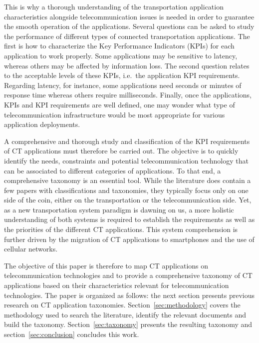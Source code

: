 This is why a thorough understanding of the transportation application characteristics alongside telecommunication issues is needed in order to guarantee the smooth operation of the applications. 
Several questions can be asked to study the performance of different types of connected transportation applications. The first is how to characterize the Key Performance Indicators (\acrshort{KPI}s) for each application to work properly. Some applications may be sensitive to latency, whereas others may be affected by information loss. The second question relates to the acceptable levels of these \acrshort{KPI}s, i.e.\ the application \acrshort{KPI} requirements. Regarding latency, for instance, some applications need seconds or minutes of response time whereas others require milliseconds. Finally, once the applications, \acrshort{KPI}s and \acrshort{KPI} requirements are well defined, one may wonder what type of telecommunication infrastructure would be most appropriate for various application deployments. 

A comprehensive and thorough study and classification of the \acrshort{KPI} requirements of \acrshort{CT} applications must therefore be carried out. The objective is to quickly identify the needs, constraints and potential telecommunication technology that can be associated to different categories of applications. To that end, a comprehensive taxonomy is an essential tool. While the literature does contain a few papers with classifications and taxonomies, they typically focus only on one side of the coin, either on the transportation or the telecommunication side. Yet, as a new transportation system paradigm is dawning on us, a more holistic understanding of both systems is required to establish the requirements as well as the priorities of the different \acrshort{CT} applications. This system comprehension is further driven by the migration of \acrshort{CT} applications to smartphones and the use of cellular networks.

The objective of this paper is therefore to map \acrshort{CT} applications on telecommunication technologies and to provide a comprehensive taxonomy of \acrshort{CT} applications based on their characteristics relevant for telecommunication technologies. The paper is organized as follows: the next section presents previous research on \acrshort{CT} application taxonomies. Section~\ref{sec:methodology} covers the methodology used to search the literature, identify the relevant documents and build the taxonomy. Section~\ref{sec:taxonomy} presents the resulting taxonomy and section~\ref{sec:conclusion} concludes this work. 

